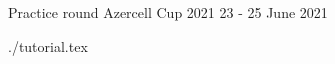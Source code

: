 \documentclass [11pt, a4paper, oneside] {article}
\begin{document}
\contest
{Practice round}%
{Azercell Cup 2021}%
{23 - 25 June 2021}%


\renewcommand{\t}{\texttt}


    \def\ProblemIndex{A}
\graphicspath{{../../problems/a+b/statements/english/}}
{./tutorial.tex}
   
\end{document}
